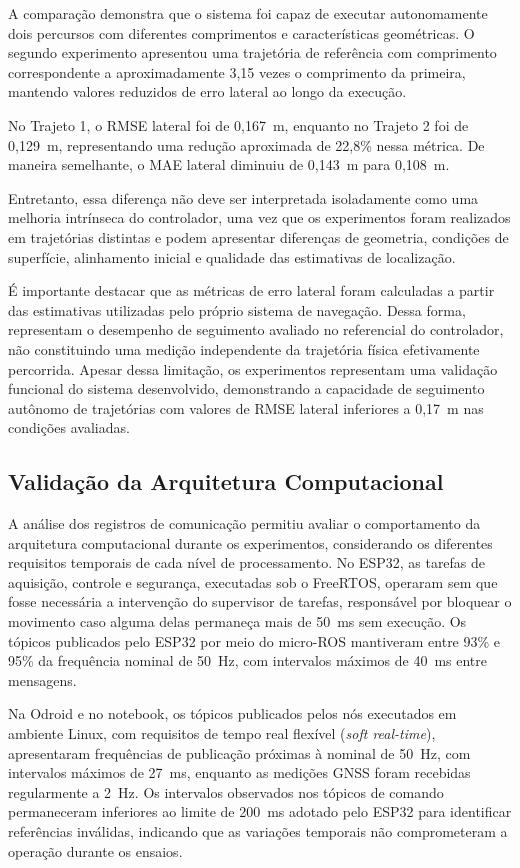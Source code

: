 A comparação demonstra que o sistema foi capaz de executar autonomamente dois percursos com diferentes comprimentos e características geométricas. O segundo experimento apresentou uma trajetória de referência com comprimento correspondente a aproximadamente 3,15 vezes o comprimento da primeira, mantendo valores reduzidos de erro lateral ao longo da execução.

No Trajeto 1, o RMSE lateral foi de 0,167~m, enquanto no Trajeto 2 foi de 0,129~m, representando uma redução aproximada de 22,8\% nessa métrica. De maneira semelhante, o MAE lateral diminuiu de 0,143~m para 0,108~m.

Entretanto, essa diferença não deve ser interpretada isoladamente como uma melhoria intrínseca do controlador, uma vez que os experimentos foram realizados em trajetórias distintas e podem apresentar diferenças de geometria, condições de superfície, alinhamento inicial e qualidade das estimativas de localização.

É importante destacar que as métricas de erro lateral foram calculadas a partir das estimativas utilizadas pelo próprio sistema de navegação. Dessa forma, representam o desempenho de seguimento avaliado no referencial do controlador, não constituindo uma medição independente da trajetória física efetivamente 
percorrida. Apesar dessa limitação, os experimentos representam uma validação funcional do sistema desenvolvido, demonstrando a capacidade de seguimento autônomo de trajetórias com valores de RMSE lateral inferiores a 0,17~m nas condições avaliadas.

\subsection{Validação da Arquitetura Computacional}
\label{subsec:validacao_arquitetura}

A análise dos registros de comunicação permitiu avaliar o comportamento da arquitetura computacional durante os experimentos, considerando os diferentes requisitos temporais de cada nível de processamento. No ESP32, as tarefas de aquisição, controle e segurança, executadas sob o FreeRTOS, operaram sem que fosse necessária a intervenção do supervisor de tarefas, responsável por bloquear o movimento caso alguma delas permaneça mais de 50~ms sem execução. Os tópicos publicados pelo ESP32 por meio do micro-ROS mantiveram entre 93\% e 95\% da frequência nominal de 50~Hz, com intervalos máximos de 40~ms entre mensagens.

Na Odroid e no notebook, os tópicos publicados pelos nós executados em ambiente Linux, com requisitos de tempo real flexível (\textit{soft real-time}), apresentaram frequências de publicação próximas à nominal de 50~Hz, com intervalos máximos de 27~ms, enquanto as medições GNSS foram recebidas regularmente a 2~Hz. Os intervalos observados nos tópicos de comando permaneceram inferiores ao limite de 200~ms adotado pelo ESP32 para identificar referências inválidas, indicando que as variações temporais não comprometeram a operação durante os ensaios.

